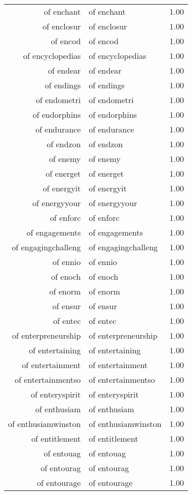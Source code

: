\begin{table}[ht]
\begin{tabular}{rlr}
  of enchant & of enchant & 1.00 \\ 
  of enclosur & of enclosur & 1.00 \\ 
  of encod & of encod & 1.00 \\ 
  of encyclopedias & of encyclopedias & 1.00 \\ 
  of endear & of endear & 1.00 \\ 
  of endings & of endings & 1.00 \\ 
  of endometri & of endometri & 1.00 \\ 
  of endorphins & of endorphins & 1.00 \\ 
  of endurance & of endurance & 1.00 \\ 
  of endzon & of endzon & 1.00 \\ 
  of enemy & of enemy & 1.00 \\ 
  of energet & of energet & 1.00 \\ 
  of energyit & of energyit & 1.00 \\ 
  of energyyour & of energyyour & 1.00 \\ 
  of enforc & of enforc & 1.00 \\ 
  of engagements & of engagements & 1.00 \\ 
  of engagingchalleng & of engagingchalleng & 1.00 \\ 
  of ennio & of ennio & 1.00 \\ 
  of enoch & of enoch & 1.00 \\ 
  of enorm & of enorm & 1.00 \\ 
  of ensur & of ensur & 1.00 \\ 
  of entec & of entec & 1.00 \\ 
  of enterpreneurship & of enterpreneurship & 1.00 \\ 
  of entertaining & of entertaining & 1.00 \\ 
  of entertainment & of entertainment & 1.00 \\ 
  of entertainmentso & of entertainmentso & 1.00 \\ 
  of enteryspirit & of enteryspirit & 1.00 \\ 
  of enthusiam & of enthusiam & 1.00 \\ 
  of enthusiamwinston & of enthusiamwinston & 1.00 \\ 
  of entitlement & of entitlement & 1.00 \\ 
  of entouag & of entouag & 1.00 \\ 
  of entourag & of entourag & 1.00 \\ 
  of entourage & of entourage & 1.00 \\ 

\end{tabular}
\end{table}
